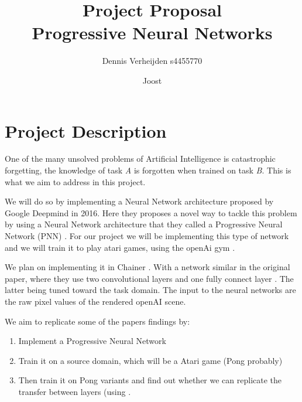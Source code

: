 \documentclass{article}
\title{Project Proposal \\ Progressive Neural Networks}
\author{Dennis Verheijden s4455770 \and Joost}
\begin{document}
\maketitle
\section*{Project Description}
One of the many unsolved problems of Artificial Intelligence is catastrophic forgetting, the knowledge of task \textit{A} is forgotten when trained on task \textit{B}. This is what we aim to address in this project.

We will do so by implementing a Neural Network architecture proposed by Google Deepmind in 2016. Here they proposes a novel way to tackle this problem by using a Neural Network architecture that they called a Progressive Neural Network (PNN) \cite{rusu2016progressive}. For our project we will be implementing this type of network and we will train it to play atari games, using the openAi gym \cite{1606.01540}.

We plan on implementing it in Chainer \cite{chainer_learningsys2015}. With a network similar in the original paper, where they use two convolutional layers and one fully connect layer \cite{1606.01540}. The latter being tuned toward the task domain. The input to the neural networks are the raw pixel values of the rendered openAI scene.

We aim to replicate some of the papers findings by:
\begin{enumerate}[1.]
\item Implement a Progressive Neural Network
\item Train it on a source domain, which will be a Atari game (Pong probably)
\item Then train it on Pong variants and find out whether we can replicate the transfer between layers (using .
\end{enumerate}



\end{document}
